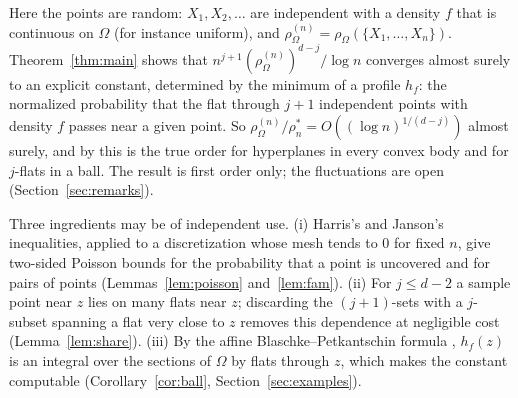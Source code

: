 \documentclass[11pt]{article}
\begin{document}
Here the points are random: $X_1,X_2,\dots$ are independent with a density $f$ that is continuous on $\Omega$ (for instance
uniform), and $\rho^{(n)}_\Omega=\rho_\Omega(\{X_1,\dots,X_n\})$. Theorem~\ref{thm:main} shows that $n^{j+1}(\rho^{(n)}_\Omega)^{d-j}/\log n$
converges almost surely to an explicit constant, determined by the minimum of a profile $h_f$: the normalized probability that the
flat through $j+1$ independent points with density $f$ passes near a given point. So $\rho^{(n)}_\Omega/\rho^*_n=O((\log
n)^{1/(d-j)})$ almost surely, and by \cite{Companion} this is the true order for hyperplanes in every convex body and for $j$-flats
in a ball. The result is first order only; the fluctuations are open (Section~\ref{sec:remarks}).

Three ingredients may be of independent use. (i) Harris's and Janson's inequalities, applied to a discretization whose mesh tends
to $0$ for fixed $n$, give two-sided Poisson bounds for the probability that a point is uncovered and for pairs of points
(Lemmas~\ref{lem:poisson} and~\ref{lem:fam}). (ii) For $j\le d-2$ a sample point near $z$ lies on many flats near $z$; discarding
the $(j+1)$-sets with a $j$-subset spanning a flat very close to $z$ removes this dependence at negligible cost (Lemma~\ref{lem:share}).
(iii) By the affine Blaschke--Petkantschin formula \cite[Theorem~7.2.7]{SW}, $h_f(z)$ is an integral over the sections of $\Omega$ by
flats through $z$, which makes the constant computable (Corollary~\ref{cor:ball}, Section~\ref{sec:examples}).
\end{document}
